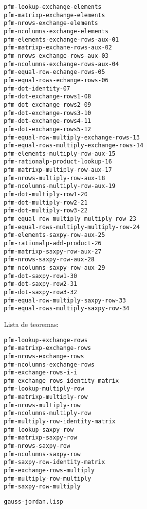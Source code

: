 \documentclass[a4paper,10pt]{article}
\begin{document}
\begin{lstlisting}[language=clips]
pfm-lookup-exchange-elements
pfm-matrixp-exchange-elements
pfm-nrows-exchange-elements
pfm-ncolumns-exchange-elements
pfm-elements-exchange-rows-aux-01
pfm-matrixp-exchane-rows-aux-02
pfm-nrows-exchange-rows-aux-03
pfm-ncolumns-exchange-rows-aux-04
pfm-equal-row-echange-rows-05
pfm-equal-rows-echange-rows-06
pfm-dot-identity-07
pfm-dot-exchange-rows1-08
pfm-dot-exchange-rows2-09
pfm-dot-exchange-rows3-10
pfm-dot-exchange-rows4-11
pfm-dot-exchange-rows5-12
pfm-equal-row-multiply-exchange-rows-13
pfm-equal-rows-multiply-exchange-rows-14
pfm-elements-multiply-row-aux-15
pfm-rationalp-product-lookup-16
pfm-matrixp-multiply-row-aux-17
pfm-nrows-multiply-row-aux-18
pfm-ncolumns-multiply-row-aux-19
pfm-dot-multiply-row1-20
pfm-dot-multiply-row2-21
pfm-dot-multiply-row3-22
pfm-equal-row-multiply-multiply-row-23
pfm-equal-rows-multiply-multiply-row-24
pfm-elements-saxpy-row-aux-25
pfm-rationalp-add-product-26
pfm-matrixp-saxpy-row-aux-27
pfm-nrows-saxpy-row-aux-28
pfm-ncolumns-saxpy-row-aux-29
pfm-dot-saxpy-row1-30
pfm-dot-saxpy-row2-31
pfm-dot-saxpy-row3-32
pfm-equal-row-multiply-saxpy-row-33 
pfm-equal-rows-multiply-saxpy-row-34
\end{lstlisting}

\par \vspace{10pt}

Lista de teoremas:

\par \vspace{10pt}

\begin{lstlisting}[language=clips]
pfm-lookup-exchange-rows
pfm-matrixp-exchange-rows
pfm-nrows-exchange-rows
pfm-ncolumns-exchange-rows
pfm-exchange-rows-i-i
pfm-exchange-rows-identity-matrix
pfm-lookup-multiply-row
pfm-matrixp-multiply-row
pfm-nrows-multiply-row
pfm-ncolumns-multiply-row
pfm-multiply-row-identity-matrix
pfm-lookup-saxpy-row
pfm-matrixp-saxpy-row                 
pfm-nrows-saxpy-row
pfm-ncolumns-saxpy-row
pfm-saxpy-row-identity-matrix
pfm-exchange-rows-multiply
pfm-multiply-row-multiply
pfm-saxpy-row-multiply
\end{lstlisting}

\par \vspace{24pt}
\texttt{gauss-jordan.lisp}

\par \vspace{10pt}
\end{document}

